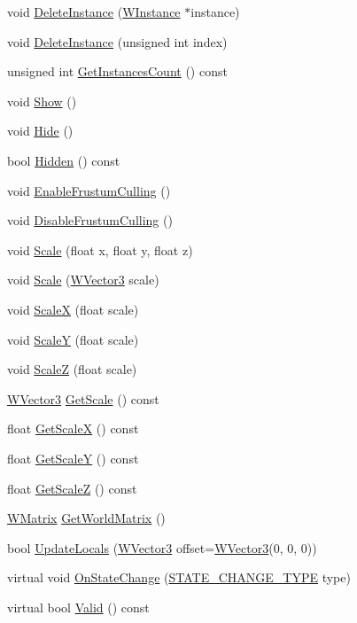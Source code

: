 \begin{DoxyCompactItemize}
void \hyperlink{class_w_object_ad408d0bc44bbcc7deabfd979caad3edd}{Delete\+Instance} (\hyperlink{class_w_instance}{W\+Instance} $\ast$instance)
\item 
void \hyperlink{class_w_object_a8f7264e7168585f60d82f6183fa35e5e}{Delete\+Instance} (unsigned int index)
\item 
unsigned int \hyperlink{class_w_object_a05dea54bb2a586ac92c51c260f542041}{Get\+Instances\+Count} () const 
\item 
void \hyperlink{class_w_object_a2f1ca8ef071fb6c259502555d6b5a47c}{Show} ()
\item 
void \hyperlink{class_w_object_a72a9f879a85cf26d72548ffc8835ad67}{Hide} ()
\item 
bool \hyperlink{class_w_object_a83f2fef49f037cac8a26f966174ecdcc}{Hidden} () const 
\item 
void \hyperlink{class_w_object_a50ad933e853950919c8742bf12bc90e8}{Enable\+Frustum\+Culling} ()
\item 
void \hyperlink{class_w_object_a15a2fef8f1ebf38e8aeee70eabbf79b8}{Disable\+Frustum\+Culling} ()
\item 
void \hyperlink{class_w_object_a1dcebfccb9dda3a0eb0f08594834eca7}{Scale} (float x, float y, float z)
\item 
void \hyperlink{class_w_object_ad4632595db1f1f661e0abb0d72e452b0}{Scale} (\hyperlink{class_w_vector3}{W\+Vector3} scale)
\item 
void \hyperlink{class_w_object_a53bf6f7cadd2ffe1b59cf1231305f31c}{ScaleX} (float scale)
\item 
void \hyperlink{class_w_object_a12dde8e7596a2ce595c509abe86606bd}{ScaleY} (float scale)
\item 
void \hyperlink{class_w_object_a9b63d725ee1feb40dcc4facafdcb63fc}{ScaleZ} (float scale)
\item 
\hyperlink{class_w_vector3}{W\+Vector3} \hyperlink{class_w_object_a1229c3548ecc1b1b64c48afaee85c5ad}{Get\+Scale} () const 
\item 
float \hyperlink{class_w_object_ade99923c893f2daf6d650e15a09f527b}{Get\+ScaleX} () const 
\item 
float \hyperlink{class_w_object_a9954b5dca076b1af9348e60c15310931}{Get\+ScaleY} () const 
\item 
float \hyperlink{class_w_object_a7e9c4970b7af1731370c7de335ff1c9d}{Get\+ScaleZ} () const 
\item 
\hyperlink{class_w_matrix}{W\+Matrix} \hyperlink{class_w_object_a95a5b7ec4028d109ee8aef1c53334d15}{Get\+World\+Matrix} ()
\item 
bool \hyperlink{class_w_object_a5fa9d24d946c66ebd96d5291aaf1a273}{Update\+Locals} (\hyperlink{class_w_vector3}{W\+Vector3} offset=\hyperlink{class_w_vector3}{W\+Vector3}(0, 0, 0))
\item 
virtual void \hyperlink{class_w_object_a0e939f965dea9e524014c0dfc771d30f}{On\+State\+Change} (\hyperlink{_w_orientation_8h_afe94de0a48bbd7b343ab18bc318cef28}{S\+T\+A\+T\+E\+\_\+\+C\+H\+A\+N\+G\+E\+\_\+\+T\+Y\+PE} type)
\item 
virtual bool \hyperlink{class_w_object_a99b053864c7797f538f15728fc7f8a2c}{Valid} () const 
\end{DoxyCompactItemize}
